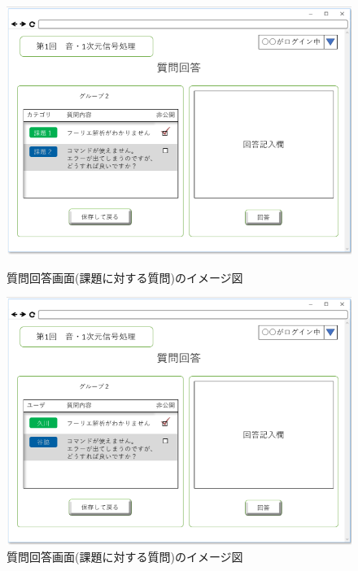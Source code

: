 \begin{figure}[htbp]
 \begin{minipage}{0.5\hsize}
  \begin{center}
   \includegraphics[width=1\linewidth,clip]{./img/24.png}
  \end{center}
  \caption{質問回答画面(課題に対する質問)のイメージ図}\label{fig:24}
 \end{minipage}
 \begin{minipage}{0.5\hsize}
  \begin{center}
   \includegraphics[width=1\linewidth,clip]{./img/25.png}
  \end{center}
  \caption{質問回答画面(課題に対する質問)のイメージ図}\label{fig:25}
 \end{minipage}
\end{figure}

